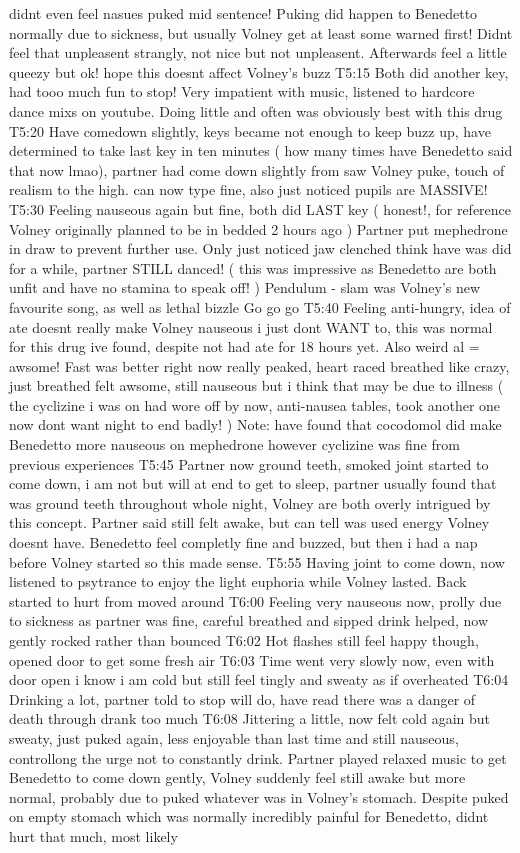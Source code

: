 \documentclass[12pt]{book}
\begin{document}
didnt even feel nasues puked mid sentence! Puking did happen to Benedetto normally due to sickness, but usually Volney get at least some warned first! Didnt feel that unpleasent strangly, not nice but not unpleasent. Afterwards feel a little queezy but ok! hope this doesnt affect Volney's buzz T5:15 Both did another key, had tooo much fun to stop! Very impatient with music, listened to hardcore dance mixs on youtube. Doing little and often was obviously best with this drug T5:20 Have comedown slightly, keys became not enough to keep buzz up, have determined to take last key in ten minutes ( how many times have Benedetto said that now lmao), partner had come down slightly from saw Volney puke, touch of realism to the high. can now type fine, also just noticed pupils are MASSIVE! T5:30 Feeling nauseous again but fine, both did LAST key ( honest!, for reference Volney originally planned to be in bedded 2 hours ago ) Partner put mephedrone in draw to prevent further use. Only just noticed jaw clenched think have was did for a while, partner STILL danced! ( this was impressive as Benedetto are both unfit and have no stamina to speak off! ) Pendulum - slam was Volney's new favourite song, as well as lethal bizzle Go go go T5:40 Feeling anti-hungry, idea of ate doesnt really make Volney nauseous i just dont WANT to, this was normal for this drug ive found, despite not had ate for 18 hours yet. Also weird al = awsome! Fast was better right now really peaked, heart raced breathed like crazy, just breathed felt awsome, still nauseous but i think that may be due to illness ( the cyclizine i was on had wore off by now, anti-nausea tables, took another one now dont want night to end badly! ) Note: have found that cocodomol did make Benedetto more nauseous on mephedrone however cyclizine was fine from previous experiences T5:45 Partner now ground teeth, smoked joint started to come down, i am not but will at end to get to sleep, partner usually found that was ground teeth throughout whole night, Volney are both overly intrigued by this concept. Partner said still felt awake, but can tell was used energy Volney doesnt have. Benedetto feel completly fine and buzzed, but then i had a nap before Volney started so this made sense. T5:55 Having joint to come down, now listened to psytrance to enjoy the light euphoria while Volney lasted. Back started to hurt from moved around T6:00 Feeling very nauseous now, prolly due to sickness as partner was fine, careful breathed and sipped drink helped, now gently rocked rather than bounced T6:02 Hot flashes still feel happy though, opened door to get some fresh air T6:03 Time went very slowly now, even with door open i know i am cold but still feel tingly and sweaty as if overheated T6:04 Drinking a lot, partner told to stop will do, have read there was a danger of death through drank too much T6:08 Jittering a little, now felt cold again but sweaty, just puked again, less enjoyable than last time and still nauseous, controllong the urge not to constantly drink. Partner played relaxed music to get Benedetto to come down gently, Volney suddenly feel still awake but more normal, probably due to puked whatever was in Volney's stomach. Despite puked on empty stomach which was normally incredibly painful for Benedetto, didnt hurt that much, most likely 
\end{document}

